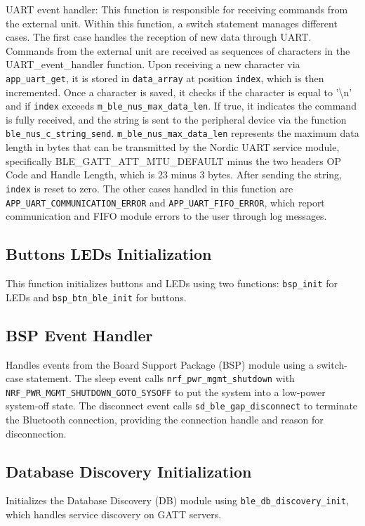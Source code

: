 \documentclass{Configuration_Files/PoliMi3i_thesis}
\begin{document}
UART event handler: This function is responsible for receiving commands from the external unit. Within this function, a switch statement manages different cases. The first case handles the reception of new data through UART. Commands from the external unit are received as sequences of characters in the UART\_event\_handler function. Upon receiving a new character via \texttt{app\_uart\_get}, it is stored in \texttt{data\_array} at position \texttt{index}, which is then incremented. Once a character is saved, it checks if the character is equal to '\textbackslash n' and if \texttt{index} exceeds \texttt{m\_ble\_nus\_max\_data\_len}. If true, it indicates the command is fully received, and the string is sent to the peripheral device via the function \texttt{ble\_nus\_c\_string\_send}. \texttt{m\_ble\_nus\_max\_data\_len} represents the maximum data length in bytes that can be transmitted by the Nordic UART service module, specifically BLE\_GATT\_ATT\_MTU\_DEFAULT minus the two headers OP Code and Handle Length, which is 23 minus 3 bytes. After sending the string, \texttt{index} is reset to zero. The other cases handled in this function are \texttt{APP\_UART\_COMMUNICATION\_ERROR} and \texttt{APP\_UART\_FIFO\_ERROR}, which report communication and FIFO module errors to the user through log messages.

\subsection*{Buttons LEDs Initialization}
This function initializes buttons and LEDs using two functions: \texttt{bsp\_init} for LEDs and \texttt{bsp\_btn\_ble\_init} for buttons.

\subsection*{BSP Event Handler}
Handles events from the Board Support Package (BSP) module using a switch-case statement. The sleep event calls \texttt{nrf\_pwr\_mgmt\_shutdown} with \texttt{NRF\_PWR\_MGMT\_SHUTDOWN\_GOTO\_SYSOFF} to put the system into a low-power system-off state. The disconnect event calls \texttt{sd\_ble\_gap\_disconnect} to terminate the Bluetooth connection, providing the connection handle and reason for disconnection.

\subsection*{Database Discovery Initialization}
Initializes the Database Discovery (DB) module using \texttt{ble\_db\_discovery\_init}, which handles service discovery on GATT servers.
\end{document}

